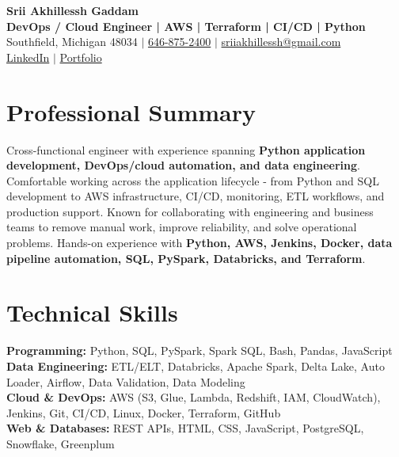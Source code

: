 \documentclass[letterpaper,10pt]{article}
\begin{document}
\fontsize{9.35pt}{10.45pt}\selectfont

\begin{center}
    {\LARGE \textbf{Srii Akhillessh Gaddam}} \\[-1pt]
    \textbf{DevOps / Cloud Engineer | AWS | Terraform | CI/CD | Python} \\[2pt]
    Southfield, Michigan 48034 $|$
    \href{tel:6468752400}{646-875-2400} $|$
    \href{mailto:sriiakhillessh@gmail.com}{sriiakhillessh@gmail.com} \\[1pt]
    \href{https://www.linkedin.com/in/srii-akhiilessh-gaddam-b48668191/}{LinkedIn} $|$
    \href{https://sriiakhillesshg.github.io/portfolio/}{Portfolio}
\end{center}
\vspace{-8pt}

\section{Professional Summary}
\small{Cross-functional engineer with experience spanning \textbf{Python application development, DevOps/cloud automation, and data engineering}. Comfortable working across the application lifecycle - from Python and SQL development to AWS infrastructure, CI/CD, monitoring, ETL workflows, and production support. Known for collaborating with engineering and business teams to remove manual work, improve reliability, and solve operational problems. Hands-on experience with \textbf{Python, AWS, Jenkins, Docker, data pipeline automation, SQL, PySpark, Databricks, and Terraform}.}

\section{Technical Skills}
\small{
\textbf{Programming:} Python, SQL, PySpark, Spark SQL, Bash, Pandas, JavaScript \\
\textbf{Data Engineering:} ETL/ELT, Databricks, Apache Spark, Delta Lake, Auto Loader, Airflow, Data Validation, Data Modeling \\
\textbf{Cloud \& DevOps:} AWS (S3, Glue, Lambda, Redshift, IAM, CloudWatch), Jenkins, Git, CI/CD, Linux, Docker, Terraform, GitHub \\
\textbf{Web \& Databases:} REST APIs, HTML, CSS, JavaScript, PostgreSQL, Snowflake, Greenplum
}
\end{document}
